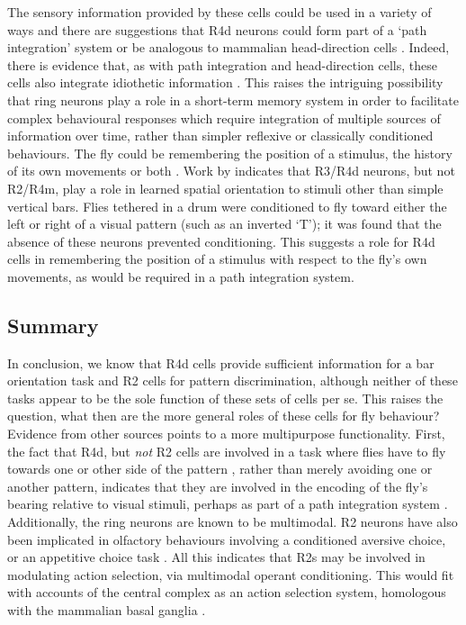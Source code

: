 The sensory information provided by these cells could be used in a variety of ways and there are suggestions that R4d neurons could form part of a `path integration' system \cite{Neuser2008} or be analogous to mammalian head-direction cells \cite{Tomchik2008}.
Indeed, there is evidence that, as with path integration and head-direction cells, these cells also integrate idiothetic information \cite{Zars2009}.
This raises the intriguing possibility that ring neurons play a role in a short-term memory system in order to facilitate complex behavioural responses which require integration of multiple sources of information over time, rather than simpler reflexive or classically conditioned behaviours. The fly could be remembering the position of a stimulus, the history of its own movements or both \cite{Tomchik2008}.
Work by  indicates that R3/R4d neurons, but not R2/R4m, play a role in learned spatial orientation to stimuli other than simple vertical bars.
Flies tethered in a drum were conditioned to fly toward either the left or right of a visual pattern (such as an inverted `T'); it was found that the absence of these neurons prevented conditioning.
This suggests a role for R4d cells in remembering the position of a stimulus with respect to the fly's own movements, as would be required in a path integration system.

\subsection{Summary}

In conclusion, we know that R4d cells provide sufficient information for a bar orientation task and R2 cells for pattern discrimination, although neither of these tasks appear to be the sole function of these sets of cells per se.
This raises the question, what then are the more general roles of these cells for fly behaviour?
Evidence from other sources points to a more multipurpose functionality.
First, the fact that R4d, but \emph{not} R2 cells are involved in a task where flies have to fly towards one or other side of the pattern \cite{Guo2015}, rather than merely avoiding one or another pattern, indicates that they are involved in the encoding of the fly's bearing relative to visual stimuli, perhaps as part of a path integration system \cite{Seelig2015}.
Additionally, the ring neurons are known to be multimodal.
R2 neurons have also been implicated in olfactory behaviours involving a conditioned aversive choice, or an appetitive choice task \cite{Azanchi2013, Zhang2013,Zhang2015}. All this indicates that R2s may be involved in modulating action selection, via multimodal operant conditioning.
This would fit with accounts of the central complex as an action selection system, homologous with the mammalian basal ganglia \cite{Strausfeld2013}.

